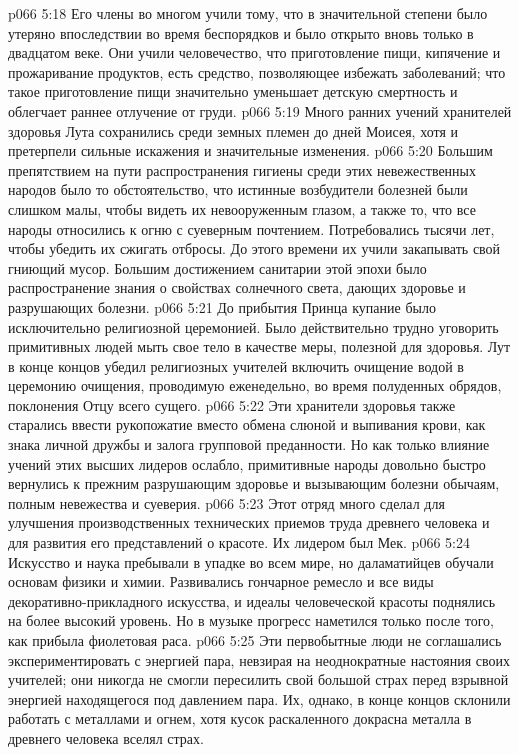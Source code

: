\vs p066 5:18 Его члены во многом учили тому, что в значительной степени было утеряно впоследствии во время беспорядков и было открыто вновь только в двадцатом веке. Они учили человечество, что приготовление пищи, кипячение и прожаривание продуктов, есть средство, позволяющее избежать заболеваний; что такое приготовление пищи значительно уменьшает детскую смертность и облегчает раннее отлучение от груди.
\vs p066 5:19 Много ранних учений хранителей здоровья Лута сохранились среди земных племен до дней Моисея, хотя и претерпели сильные искажения и значительные изменения.
\vs p066 5:20 Большим препятствием на пути распространения гигиены среди этих невежественных народов было то обстоятельство, что истинные возбудители болезней были слишком малы, чтобы видеть их невооруженным глазом, а также то, что все народы относились к огню с суеверным почтением. Потребовались тысячи лет, чтобы убедить их сжигать отбросы. До этого времени их учили закапывать свой гниющий мусор. Большим достижением санитарии этой эпохи было распространение знания о свойствах солнечного света, дающих здоровье и разрушающих болезни.
\vs p066 5:21 До прибытия Принца купание было исключительно религиозной церемонией. Было действительно трудно уговорить примитивных людей мыть свое тело в качестве меры, полезной для здоровья. Лут в конце концов убедил религиозных учителей включить очищение водой в церемонию очищения, проводимую еженедельно, во время полуденных обрядов, поклонения Отцу всего сущего.
\vs p066 5:22 Эти хранители здоровья также старались ввести рукопожатие вместо обмена слюной и выпивания крови, как знака личной дружбы и залога групповой преданности. Но как только влияние учений этих высших лидеров ослабло, примитивные народы довольно быстро вернулись к прежним разрушающим здоровье и вызывающим болезни обычаям, полным невежества и суеверия.
\vs p066 5:23 \pc {}\bibnobreakspace {} Этот отряд много сделал для улучшения производственных технических приемов труда древнего человека и для развития его представлений о красоте. Их лидером был Мек.
\vs p066 5:24 Искусство и наука пребывали в упадке во всем мире, но даламатийцев обучали основам физики и химии. Развивались гончарное ремесло и все виды декоративно\hyp{}прикладного искусства, и идеалы человеческой красоты поднялись на более высокий уровень. Но в музыке прогресс наметился только после того, как прибыла фиолетовая раса.
\vs p066 5:25 Эти первобытные люди не соглашались экспериментировать с энергией пара, невзирая на неоднократные настояния своих учителей; они никогда не смогли пересилить свой большой страх перед взрывной энергией находящегося под давлением пара. Их, однако, в конце концов склонили работать с металлами и огнем, хотя кусок раскаленного докрасна металла в древнего человека вселял страх.
